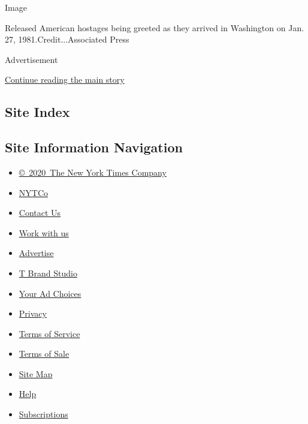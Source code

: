 Image

Released American hostages being greeted as they arrived in Washington
on Jan. 27, 1981.Credit...Associated Press

Advertisement

\protect\hyperlink{after-bottom}{Continue reading the main story}

\hypertarget{site-index}{%
\subsection{Site Index}\label{site-index}}

\hypertarget{site-information-navigation}{%
\subsection{Site Information
Navigation}\label{site-information-navigation}}

\begin{itemize}
\tightlist
\item
  \href{https://help.nytimes.com/hc/en-us/articles/115014792127-Copyright-notice}{©~2020~The
  New York Times Company}
\end{itemize}

\begin{itemize}
\tightlist
\item
  \href{https://www.nytco.com/}{NYTCo}
\item
  \href{https://help.nytimes.com/hc/en-us/articles/115015385887-Contact-Us}{Contact
  Us}
\item
  \href{https://www.nytco.com/careers/}{Work with us}
\item
  \href{https://nytmediakit.com/}{Advertise}
\item
  \href{http://www.tbrandstudio.com/}{T Brand Studio}
\item
  \href{https://www.nytimes.com/privacy/cookie-policy\#how-do-i-manage-trackers}{Your
  Ad Choices}
\item
  \href{https://www.nytimes.com/privacy}{Privacy}
\item
  \href{https://help.nytimes.com/hc/en-us/articles/115014893428-Terms-of-service}{Terms
  of Service}
\item
  \href{https://help.nytimes.com/hc/en-us/articles/115014893968-Terms-of-sale}{Terms
  of Sale}
\item
  \href{https://spiderbites.nytimes.com}{Site Map}
\item
  \href{https://help.nytimes.com/hc/en-us}{Help}
\item
  \href{https://www.nytimes.com/subscription?campaignId=37WXW}{Subscriptions}
\end{itemize}

